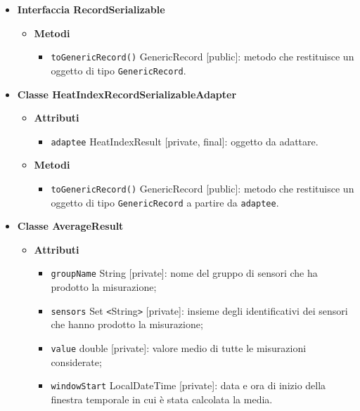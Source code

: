 \begin{itemize}
\begin{itemize}
	      \end{itemize}
	\item \textbf{Interfaccia RecordSerializable}\label{record_serializable}
	      \begin{itemize}
		      \item \textbf{Metodi}
		            \begin{itemize}
			            \item \texttt{toGenericRecord()} GenericRecord [public]: metodo che restituisce un oggetto di tipo \texttt{GenericRecord}.
		            \end{itemize}
	      \end{itemize}
	\item \textbf{Classe HeatIndexRecordSerializableAdapter}
	      \begin{itemize}
		      \item \textbf{Attributi}
		            \begin{itemize}
			            \item \texttt{adaptee} HeatIndexResult [private, final]: oggetto da adattare.
		            \end{itemize}
		      \item \textbf{Metodi}
		            \begin{itemize}
			            \item \texttt{toGenericRecord()} GenericRecord [public]: metodo che restituisce un oggetto di tipo \texttt{GenericRecord} a partire da \texttt{adaptee}.
		            \end{itemize}
	      \end{itemize}
	\item \textbf{Classe AverageResult}
	      \begin{itemize}
		      \item \textbf{Attributi}
		            \begin{itemize}
			            \item \texttt{groupName} String [private]: nome del gruppo di sensori che ha prodotto la misurazione;
			            \item \texttt{sensors} Set \texttt{<}String\texttt{>} [private]: insieme degli identificativi dei sensori che hanno prodotto la misurazione;
			            \item \texttt{value} double [private]: valore medio di tutte le misurazioni considerate;
			            \item \texttt{windowStart} LocalDateTime [private]: data e ora di inizio della finestra temporale in cui è stata calcolata la media.

\end{itemize}
\end{itemize}
\end{itemize}

